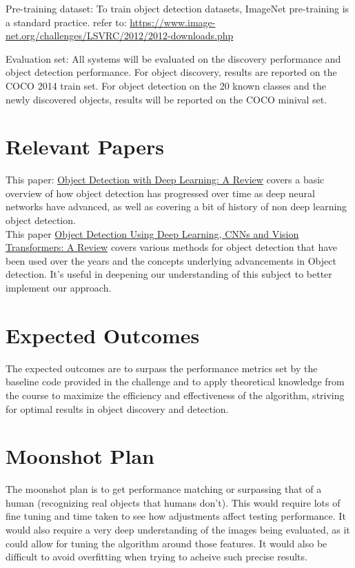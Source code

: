 \documentclass{article}
\begin{document}
	Pre-training dataset: To train object detection datasets, ImageNet pre-training is a standard practice. refer to: \url{https://www.image-net.org/challenges/LSVRC/2012/2012-downloads.php}
	
	Evaluation set: All systems will be evaluated on the discovery performance and object detection performance. For object discovery, results are reported on the COCO 2014 train set. For object detection on the 20 known classes and the newly discovered objects, results will be reported on the COCO minival set.
	
	\section{Relevant Papers}
 This paper: \href{https://arxiv.org/pdf/1807.05511.pdf}{Object Detection with Deep Learning: A Review} covers a basic overview of how object detection has progressed over time as deep neural networks have advanced, as well as covering a bit of history of non deep learning object detection.\\
 This paper \href{https://ieeexplore.ieee.org/document/10098596}{Object Detection Using Deep Learning, CNNs and Vision Transformers: A Review} covers various methods for object detection that have been used over the years and the concepts underlying advancements in Object detection. It's useful in deepening our understanding of this subject to better implement our approach.
	\section{Expected Outcomes}
	
	
	The expected outcomes are to surpass the performance metrics set by the baseline code provided in the challenge and to apply theoretical knowledge from the course to maximize the efficiency and effectiveness of the algorithm, striving for optimal results in object discovery and detection.
	
	\section{Moonshot Plan}
    The moonshot plan is to get performance matching or surpassing that of a human (recognizing real objects that humans don't). This would require lots of fine tuning and time taken to see how adjustments affect testing performance. It would also require a very deep understanding of the images being evaluated, as it could allow for tuning the algorithm around those features.  It would also be difficult to avoid overfitting when trying to acheive such precise results.
\end{document}
